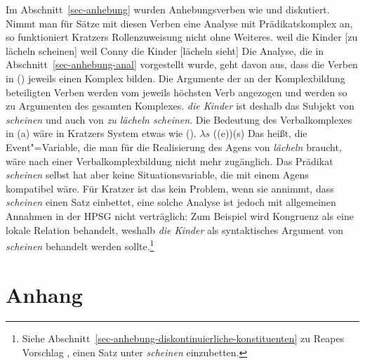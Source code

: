 {%

Im Abschnitt~\ref{sec-anhebung} wurden Anhebungsverben wie  und  diskutiert.
Nimmt man für Sätze mit diesen Verben eine Analyse mit Prädikatskomplex an, so funktioniert Kratzers
Rollenzuweisung nicht ohne Weiteres.
\eal
\ex weil die Kinder [zu lächeln scheinen]
\ex weil Conny die Kinder [lächeln sieht]
\zl
Die Analyse, die in Abschnitt~\ref{sec-anhebung-anal} vorgestellt wurde, geht davon aus, dass die Verben
in () jeweils einen Komplex bilden. Die Argumente der an der Komplexbildung beteiligten Verben
werden vom jeweils höchsten Verb angezogen und werden so zu Argumenten des gesamten Komplexes.
\emph{die Kinder} ist deshalb das Subjekt von \emph{scheinen} und auch von \emph{zu lächeln scheinen}. Die
Bedeutung des Verbalkomplexes in (a) wäre in Kratzers System etwas wie ().
\ea
$\lambda s$ ((e))(s)
\z
Das heißt, die Event"=Variable, die man für die Realisierung des Agens von \emph{lächeln} braucht, wäre
nach einer Verbalkomplexbildung nicht mehr zugänglich. Das Prädikat \emph{scheinen} selbst
hat aber keine Situationsvariable, die mit einem Agens kompatibel wäre.
Für Kratzer ist das kein Problem, wenn sie annimmt, dass \emph{scheinen} einen Satz einbettet, 
eine solche Analyse ist jedoch mit allgemeinen Annahmen in der HPSG nicht verträglich: 
Zum Beispiel wird Kongruenz als eine lokale Relation behandelt, weshalb
\emph{die Kinder} als syntaktisches Argument von \emph{scheinen} behandelt werden sollte.\footnote{
  Siehe Abschnitt~\ref{sec-anhebung-diskontinuierliche-konstituenten}
zu Reapes Vorschlag \citeyearpar{Reape94a},
  einen Satz unter \emph{scheinen} einzubetten.%
}

\section{Anhang}
\label{kasus-anhang}
\label{sec-realized}

}
